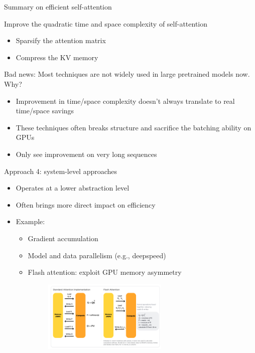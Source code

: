 \documentclass[usenames,dvipsnames,notes,11pt,aspectratio=169,hyperref={colorlinks=true, linkcolor=blue}]{beamer}
\begin{document}
\begin{frame}
    {Summary on efficient self-attention}

    Improve the quadratic time and space complexity of self-attention\\
    \begin{itemize}
        \item Sparsify the attention matrix
        \item Compress the KV memory
    \end{itemize}

    \pause
    Bad news: Most techniques are not widely used in large pretrained models now. Why?\\
    \begin{itemize}
        \item Improvement in time/space complexity doesn't always translate to real time/space savings
        \item These techniques often breaks structure and sacrifice the batching ability on GPUs
        \item Only see improvement on very long sequences
    \end{itemize}
\end{frame}

\begin{frame}
    {Approach 4: system-level approaches}
    \begin{itemize}
        \item Operates at a lower abstraction level
        \item Often brings more direct impact on efficiency
        \item Example:
            \begin{itemize}
                \item Gradient accumulation
                \item Model and data parallelism (e.g., deepspeed)
                \item Flash attention: exploit GPU memory asymmetry
                    \begin{figure}
    \includegraphics[width=0.6\textwidth]{figures/flash-attention}\\
                    \end{figure}
            \end{itemize}
    \end{itemize}
\end{frame}
\end{document}
